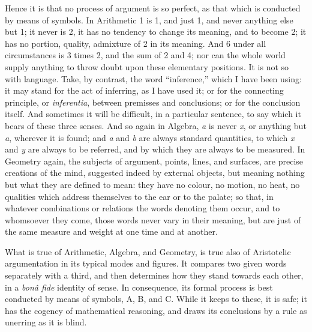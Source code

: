 Hence it is that no process of argument is so perfect, as that
which is conducted by means of symbols. In Arithmetic 1 is 1, and just
1, and never anything else but 1; it never is 2, it has no tendency to
change its meaning, and to become 2; it has no portion, quality,
admixture of 2 in its meaning. And 6 under all circumstances is 3
times 2, and the sum of 2 and 4; nor can the whole world supply
anything to throw doubt upon these elementary positions. It is not so
with language. Take, by contrast, the word ``inference,''
which I have been using: it may stand for the act of inferring, as I
have used it; or for the connecting principle, or \emph{inferentia},
between premisses and conclusions; or for the conclusion itself. And
sometimes it will be difficult, in a particular sentence, to say which
it bears of these three senses. And so again in Algebra, \emph{a} is
never \emph{x}, or anything but \emph{a}, wherever it is found; and \emph{a}
and \emph{b} are always standard quantities, to which \emph{x} and \emph{y}
are always to be referred, and by which they are always to be
measured. In Geometry again, the subjects of argument, points, lines,
and surfaces, are precise creations of the mind, suggested indeed by
external objects, but meaning nothing but what they are defined to
mean: they have no colour, no motion, no heat, no qualities which
address themselves to the ear or to the palate; so that, in whatever
combinations or relations the words denoting them occur, and to
whomsoever they come, those words never vary in their meaning, but are
just of the same measure and weight at one time and at another.

What is true of Arithmetic, Algebra, and Geometry, is true also of
Aristotelic argumentation in its typical modes and figures. It
compares two given words separately with a third, and then determines
how they stand towards each other, in a \emph{bonâ fide} identity of
sense. In consequence, its formal process is best conducted by means
of symbols, A, B, and C. While it keeps to these, it is safe; it has
the cogency of mathematical reasoning, and draws its conclusions by a
rule as unerring as it is blind.

